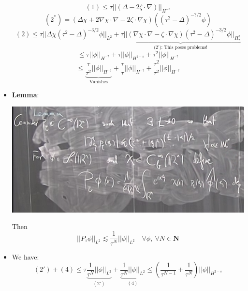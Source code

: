 \documentclass{article}
\begin{document}
\begin{itemize}
 
    \begin{equation}
        (1) \leq \tau ||(\Delta - 2 \zeta \cdot \nabla)||_{H^{-?}}
    \end{equation}
    \begin{equation}
        (2^*) = (\Delta \chi + 2 \nabla \chi \cdot \nabla - 2 \zeta \cdot \nabla \chi)((\tau^2 - \Delta)^{-?/2}\phi) 
    \end{equation}
    \begin{equation}
        (2) \leq \tau || \Delta \chi (\tau^2 - \Delta)^{-3/2} \phi ||_{L^2} + \underbrace{\tau ||(\nabla \chi \cdot \nabla - \zeta \cdot \nabla \chi)(\tau^2 - \Delta)^{-3/2}\phi ||_{H_\tau^?}}_{\text{(2'): This poses problems!}}
    \end{equation}
    \begin{equation}
        \leq \tau || \phi||_{H^{-?}} + \tau || \phi||_{H^{1-s}} + \tau^2 || \phi||_{H^{-?}}
    \end{equation}
    \begin{equation}
        \leq \underbrace{\frac{\tau}{\tau^2} || \phi||_{H^{-?}}}_{\text{Vanishes}} + \frac{\tau}{\tau} || \phi||_{H^{-?}} + \frac{\tau^2}{\tau^2} || \phi||_{H^{-?}}
    \end{equation}

    \item \textbf{Lemma}:
    
    \includegraphics[width=\textwidth]{images/5.png}
    
    Then
    \begin{equation}
        || P_\tau \phi ||_{L^2} \lesssim \frac{1}{\tau^N} ||\phi||_{L^2} \quad \forall \phi, \ \forall N \in \mathbf{N}
    \end{equation}

    \item We have:
    \begin{equation}
        (2') + (4) \leq \tau \underbrace{\frac{1}{\tau^N} ||\phi||_{L^2}}_{(2')} + \underbrace{\frac{1}{\tau^N} || \phi||_{L^2}}_{(4)} \leq (\frac{1}{\tau^{N-1}} + \frac{1}{\tau^N})|| \phi||_{H^{2-s}}
    \end{equation}



\end{itemize}
\end{document}
